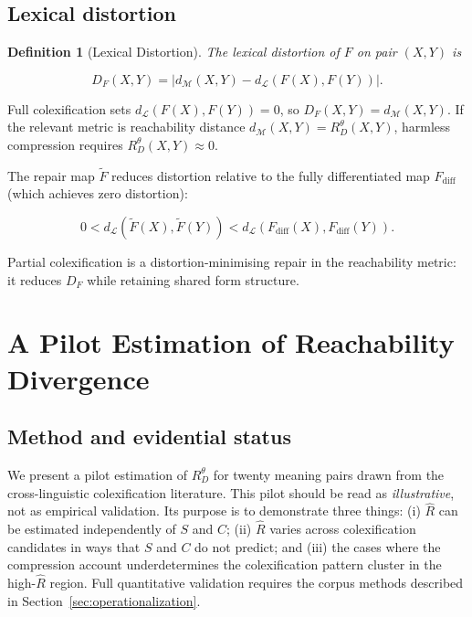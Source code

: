 \documentclass[12pt]{article}
\theoremstyle{rthm}
\theoremstyle{rdef}
\newtheorem{definition}[theorem]{Definition}
\theoremstyle{remark}
\newcommand{\RD}[1][\theta]{R_{D}^{#1}}
\newcommand{\Fdiff}{F_{\mathrm{diff}}}
\newcommand{\Ftil}{\widetilde{F}}
\newcommand{\dM}{d_{\mathcal{M}}}
\newcommand{\dL}{d_{\mathcal{L}}}
\begin{document}
\subsection{Lexical distortion}

\begin{definition}[Lexical Distortion]
The \emph{lexical distortion} of $F$ on pair $(X,Y)$ is

\[
D_F(X,Y) = \bigl|\dM(X,Y) - \dL(F(X), F(Y))\bigr|.
\]
\end{definition}

Full colexification sets $\dL(F(X), F(Y)) = 0$, so $D_F(X,Y) = \dM(X,Y)$. If
the relevant metric is reachability distance $\dM(X,Y) = \RD(X,Y)$, harmless
compression requires $\RD(X,Y) \approx 0$.

The repair map $\Ftil$ reduces distortion relative to the fully differentiated
map $\Fdiff$ (which achieves zero distortion):

\[
0 < \dL\!\left(\Ftil(X), \Ftil(Y)\right) < \dL\!\left(\Fdiff(X), \Fdiff(Y)\right).
\]

Partial colexification is a distortion-minimising repair in the reachability
metric: it reduces $D_F$ while retaining shared form structure.

\section{A Pilot Estimation of Reachability Divergence}
\label{sec:pilot}

\subsection{Method and evidential status}

We present a pilot estimation of $\RD$ for twenty meaning pairs drawn from the
cross-linguistic colexification literature. This pilot should be read as
\emph{illustrative}, not as empirical validation. Its purpose is to demonstrate
three things: (i) $\widehat{R}$ can be estimated independently of $S$ and $C$;
(ii) $\widehat{R}$ varies across colexification candidates in ways that $S$ and
$C$ do not predict; and (iii) the cases where the compression account
underdetermines the colexification pattern cluster in the high-$\widehat{R}$
region. Full quantitative validation requires the corpus methods described in
Section~\ref{sec:operationalization}.
\end{document}
